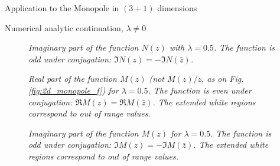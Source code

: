 \begin{section}{Application to the Monopole in $(3+1)$ dimensions}
\begin{subsection}{Numerical analytic continuation, $\lambda \neq 0$}
    \begin{figure}[!ht]
      \begin{center}
        
        \caption{\em Imaginary part of the function $N(z)$ with
          $\lambda = 0.5$. The function is odd under conjugation: $\Im
          N(z) = -\Im N(\bar z)$.}
        \label{fig:cm_monopole_f_imag}
      \end{center}
    \end{figure}

    \begin{figure}[!ht]
      \begin{center}
        
        \caption{\em Real part of the function $M(z)$ (not $M(z)/z$,
          as on Fig. \ref{fig:2d_monopole_f}) for $\lambda = 0.5$. The
          function is even under conjugation: $\Re M(z) = \Re M(\bar
          z)$. The extended white regions correspond to
          out of range values.}
        \label{fig:cm_monopole_h_real}
      \end{center}
    \end{figure}

    \begin{figure}[!ht]
      \begin{center}
        
        \caption{\em Imaginary part of the function $M(z)$ for
          $\lambda = 0.5$. The function is odd under conjugation:
          $\Im M(z) = -\Im M(\bar z)$. The extended white regions correspond to
          out of range values.}
        \label{fig:cm_monopole_h_imag}
      \end{center}
    \end{figure}
  \end{subsection}
\end{section}

